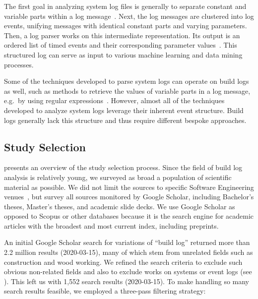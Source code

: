 The first goal in analyzing system log files is generally to
separate constant and variable parts within a log
message~\cite{nagappan2010abstracting,he2017towards}.
Next, the log
messages are clustered into log events, unifying messages with
identical constant parts and varying parameters.
Then, a log parser works on this intermediate representation.
Its output is an ordered list of timed events and their corresponding
parameter values~\cite{he2016evaluation}.
This structured log can serve as input to various machine learning and
data mining processes.

Some of the techniques developed to parse system logs can operate
on build logs as well, such as methods to retrieve the
values of variable parts in a log message, e.g.\ by using regular
expressions~\cite{nagappan2010abstracting,xu2009detecting}.
However, almost all of the techniques developed to analyze system logs
leverage their inherent event structure.
Build logs generally lack this structure and thus require different
bespoke approaches.

\subsection{Study Selection}
 presents an overview of the study selection
process.
Since the field of build log analysis is relatively young, we
surveyed as broad a population of scientific material as possible.
We did not limit the sources to specific Software Engineering
venues~\cite{petersen2015guidelines}, but survey all sources
monitored by Google Scholar, including Bachelor's theses, Master's
theses, and academic slide decks.
We use Google Scholar as opposed to Scopus or
other databases because it is the search engine for academic articles with
the broadest and most current index, including preprints.

An initial Google Scholar search for variations of ``build log''
returned more than 2.2 million results (2020-03-15), many of which stem
from unrelated fields such as construction and wood working.
We refined the search criteria to exclude such obvious
non-related fields and also to exclude works on systems
or event logs (see ).
This left us with 1,552 search results
(2020-03-15).
To make handling so many search results feasible, we employed a
three-pass filtering strategy:

